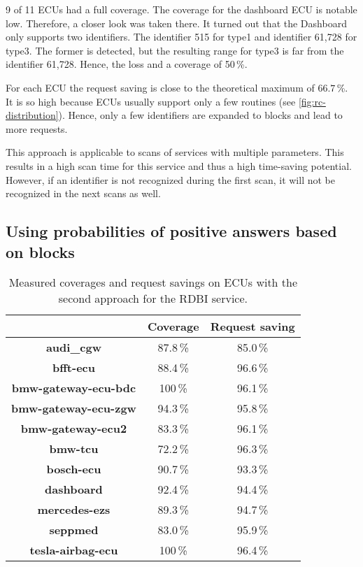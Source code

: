 9 of 11 ECUs had a full coverage. The coverage for the dashboard ECU is notable low. Therefore, a closer look was taken there. 
It turned out that the Dashboard only supports two identifiers. The identifier 515 for type1 and identifier 61,728 for type3. The former is detected, but the resulting range for type3 is far from the identifier 61,728. Hence, the loss and a coverage of 50\,\%.

For each ECU the request saving is close to the theoretical maximum of $66.7$\,\%. 
It is so high because ECUs usually support only a few routines (see \autoref{fig:rc-distribution}). Hence, only a few identifiers are expanded to blocks and lead to more requests.

This approach is applicable to scans of services with multiple parameters. 
This results in a high scan time for this service and thus a high time-saving potential. 
However, if an identifier is not recognized during the first scan, it will not be recognized in the next scans as well.


\subsection{Using probabilities of positive answers based on blocks}

\begin{table}[H]
    \begin{center}
    \begin{tabular}{ccc}
        \hline
        & \textbf{Coverage} & \textbf{Request saving} \\
        \hline
        \textbf{audi\_cgw} & 87.8\,\% & 85.0\,\% \\
        \textbf{bfft-ecu} & 88.4\,\% & 96.6\,\% \\
        \textbf{bmw-gateway-ecu-bdc} & 100\,\% & 96.1\,\% \\
        \textbf{bmw-gateway-ecu-zgw} & 94.3\,\% & 95.8\,\% \\
        \textbf{bmw-gateway-ecu2} & 83.3\,\% & 96.1\,\% \\
        \textbf{bmw-tcu} & 72.2\,\% & 96.3\,\% \\
        \textbf{bosch-ecu} & 90.7\,\% & 93.3\,\% \\
        \textbf{dashboard} & 92.4\,\% & 94.4\,\% \\
        \textbf{mercedes-ezs} & 89.3\,\% & 94.7\,\% \\
        \textbf{seppmed} & 83.0\,\% & 95.9\,\% \\
        \textbf{tesla-airbag-ecu} & 100\,\% & 96.4\,\% \\
        \hline
    \end{tabular}
    \end{center}
    \caption{Measured coverages and request savings on ECUs with the second approach for the RDBI service.}
    \label{tab:evaluation-approach2}
\end{table}

